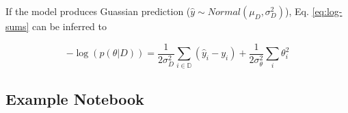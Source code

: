 \documentclass{article}
\begin{document}
If the model produces Guassian prediction ($\hat{y} \sim Normal(\mu_D, \sigma^{2}_{D})$), Eq. \ref{eq:log-sums} can be inferred to 

\begin{equation}
    -\log(p(\theta |D)) = \frac{1}{2\sigma^{2}_{D}} \sum_{i \in \mathbb{D}}(\hat{y}_i - y_i) + \frac{1}{2\sigma^{2}_{\theta}} \sum_{i}\theta_{i}^{2}
\end{equation}


\subsection{Example Notebook}


\end{document}
